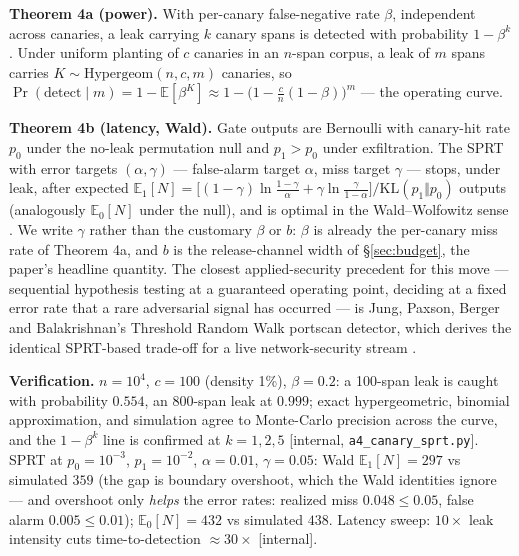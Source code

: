 \documentclass[11pt,a4paper]{article}
\begin{document}
\begin{thebox}
\textbf{Theorem 4a (power).} With per-canary false-negative rate $\beta$, independent across canaries, a leak carrying $k$ canary
spans is detected with probability $1-\beta^k$. Under uniform planting of $c$ canaries in an $n$-span corpus, a leak of $m$ spans
carries $K\sim\mathrm{Hypergeom}(n,c,m)$ canaries, so $\Pr(\text{detect}\mid m)=1-\mathbb{E}[\beta^K]\approx
1-\bigl(1-\tfrac{c}{n}(1-\beta)\bigr)^m$ --- the operating curve.

\textbf{Theorem 4b (latency, Wald).} Gate outputs are Bernoulli with canary-hit rate $p_0$ under the no-leak permutation null and
$p_1>p_0$ under exfiltration. The SPRT with error targets $(\alpha,\gamma)$ --- false-alarm target $\alpha$, miss target $\gamma$
--- stops, under leak, after expected
$\mathbb{E}_1[N]=\bigl[(1-\gamma)\ln\tfrac{1-\gamma}{\alpha}+\gamma\ln\tfrac{\gamma}{1-\alpha}\bigr]/\mathrm{KL}(p_1\Vert p_0)$ outputs (analogously
$\mathbb{E}_0[N]$ under the null), and is optimal in the Wald--Wolfowitz sense \cite{wald,wald-wolfowitz}. We write $\gamma$
rather than the customary $\beta$ or $b$: $\beta$ is already the per-canary miss rate of Theorem 4a, and $b$ is the release-channel
width of \S\ref{sec:budget}, the paper's headline quantity. The closest applied-security precedent for this move --- sequential
hypothesis testing at a guaranteed operating point, deciding at a fixed error rate that a rare adversarial signal has occurred ---
is Jung, Paxson, Berger and Balakrishnan's Threshold Random Walk portscan detector, which derives the identical SPRT-based
trade-off for a live network-security stream \cite{jpbb04}.

\textbf{Verification.} $n{=}10^4$, $c{=}100$ (density 1\%), $\beta{=}0.2$: a 100-span leak is caught with probability $0.554$, an
800-span leak at $0.999$; exact hypergeometric, binomial approximation, and simulation agree to Monte-Carlo precision across the
curve, and the $1-\beta^k$ line is confirmed at $k{=}1,2,5$ [internal, \texttt{a4\_canary\_sprt.py}]. SPRT at $p_0{=}10^{-3}$,
$p_1{=}10^{-2}$, $\alpha{=}0.01$, $\gamma{=}0.05$: Wald $\mathbb{E}_1[N]=297$ vs simulated $359$ (the gap is boundary overshoot, which
the Wald identities ignore --- and overshoot only \emph{helps} the error rates: realized miss $0.048\le 0.05$, false alarm
$0.005\le 0.01$); $\mathbb{E}_0[N]=432$ vs simulated $438$. Latency sweep: $10\times$ leak intensity cuts time-to-detection
$\approx 30\times$
[internal].
\end{thebox}
\end{document}
